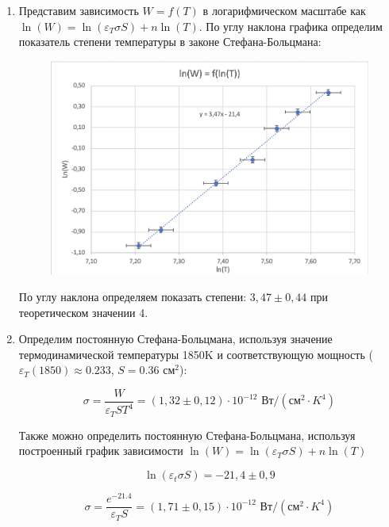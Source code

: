\documentclass[a4paper, 12pt]{article}%
\begin{document}
\begin{enumerate}
\begin{enumerate}
\item Представим зависимость $W= f(T)$ в логарифмическом масштабе как $\ln(W) = \ln(\varepsilon_T \sigma S) + n \ln(T)$.  По углу наклона графика определим показатель степени температуры в законе Стефана-Больцмана:

\begin{figure}[ht]
    \centering
    \includegraphics[width=12cm]{График3.PNG}
\end{figure}

По углу наклона определяем показать степени: $3,47 \pm 0, 44$ при теоретическом значении 4.

\item Определим постоянную Стефана-Больцмана, используя значение термодинамической температуры 1850K и соответствующую мощность ($\varepsilon_T(1850) \approx 0.233$, $S = 0.36$ см$^2$):

\begin{center}

\[\sigma = \frac{W}{\varepsilon_T S T^4} = (1, 32 \pm 0,12) \cdot 10^{-12} \text{ Вт}/(\text{см}^2 \cdot K^4)\]

\end{center}

Также можно определить постоянную Стефана-Больцмана, используя построенный график зависимости $\ln(W) = \ln(\varepsilon_T \sigma S) + n \ln(T)$

\begin{center}

\[\ln(\varepsilon_t \sigma S) = -21,4 \pm 0,9\] 
   
\[\sigma = \frac{e^{-21.4}}{\varepsilon_T S} = (1, 71 \pm 0,15) \cdot 10^{-12} \text{ Вт}/(\text{см}^2 \cdot K^4)\]
    
\end{center}


\end{enumerate}
\end{enumerate}
\end{document}
